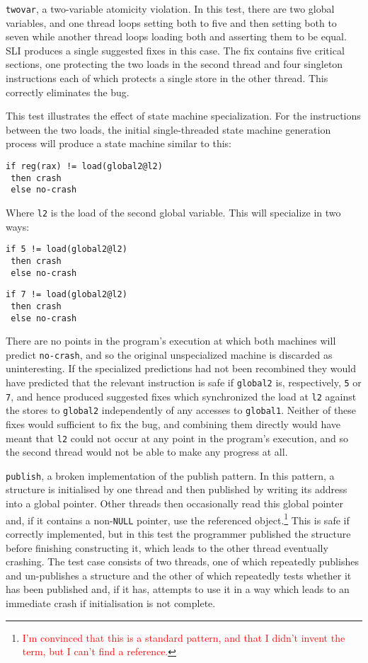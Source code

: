 \documentclass[10pt,twocolumn,preprint,natbib,authoryear]{sigplanconf}
\newcommand{\editorial}[1]{\textcolor{red}{\footnote{\textcolor{red}{#1}}}}
\begin{document}
\verb|twovar|, a two-variable atomicity violation.  In this test,
there are two global variables, and one thread loops setting both to
five and then setting both to seven while another thread loops loading
both and asserting them to be equal.  SLI produces a single suggested
fixes in this case.  The fix contains five critical sections, one
protecting the two loads in the second thread and four singleton
instructions each of which protects a single store in the other
thread.  This correctly eliminates the bug.

This test illustrates the effect of state machine specialization.  For
the instructions between the two loads, the initial single-threaded
state machine generation process will produce a state machine similar
to this:

\begin{verbatim}
if reg(rax) != load(global2@l2)
 then crash
 else no-crash
\end{verbatim}

Where \verb|l2| is the load of the second global variable.  This
will specialize in two ways:

\begin{verbatim}
if 5 != load(global2@l2)
 then crash
 else no-crash
\end{verbatim}

\begin{verbatim}
if 7 != load(global2@l2)
 then crash
 else no-crash
\end{verbatim}

There are no points in the program's execution at which both machines
will predict \verb|no-crash|, and so the original unspecialized
machine is discarded as uninteresting.  If the specialized predictions
had not been recombined they would have predicted that the relevant
instruction is safe if \verb|global2| is, respectively, \verb|5| or
\verb|7|, and hence produced suggested fixes which synchronized the
load at \verb|l2| against the stores to \verb|global2| independently
of any accesses to \verb|global1|.  Neither of these fixes would
sufficient to fix the bug, and combining them directly would have
meant that \verb|l2| could not occur at any point in the program's
execution, and so the second thread would not be able to make any
progress at all.

\verb|publish|, a broken implementation of the publish pattern.  In
this pattern, a structure is initialised by one thread and then
published by writing its address into a global pointer.  Other threads
then occasionally read this global pointer and, if it contains a
non-\verb|NULL| pointer, use the referenced object.\editorial{I'm
  convinced that this is a standard pattern, and that I didn't invent
  the term, but I can't find a reference.}  This is safe if correctly
implemented, but in this test the programmer published the structure
before finishing constructing it, which leads to the other thread
eventually crashing.  The test case consists of two threads, one of
which repeatedly publishes and un-publishes a structure and the other
of which repeatedly tests whether it has been published and, if it
has, attempts to use it in a way which leads to an immediate crash if
initialisation is not complete.
\end{document}
